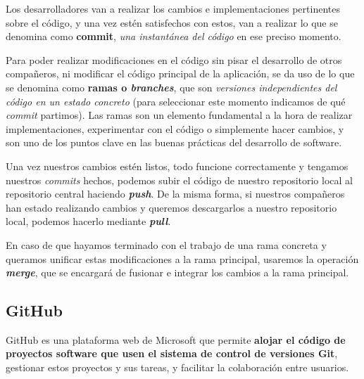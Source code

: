 
Los desarrolladores van a realizar los cambios e implementaciones pertinentes sobre el código, y una vez estén satisfechos con estos, van a realizar lo que se denomina como \textbf{commit}, \textit{una instantánea del código} en ese preciso momento.


Para poder realizar modificaciones en el código sin pisar el desarrollo de otros compañeros, ni modificar el código principal de la aplicación, se da uso de lo que se denomina como \textbf{ramas o \textit{branches}}, que son \textit{versiones independientes del código en un estado concreto} (para seleccionar este momento indicamos de qué \textit{commit} partimos). Las ramas son un elemento fundamental a la hora de realizar implementaciones, experimentar con el código o simplemente hacer cambios, y son uno de los puntos clave en las buenas prácticas del desarrollo de software.

Una vez nuestros cambios estén listos, todo funcione correctamente y tengamos nuestros \textit{commits} hechos, podemos subir el código de nuestro repositorio local al repositorio central haciendo \textit{\textbf{push}}. De la misma forma, si nuestros compañeros han estado realizando cambios y queremos descargarlos a nuestro repositorio local, podemos hacerlo mediante \textit{\textbf{pull}}.


En caso de que hayamos terminado con el trabajo de una rama concreta y queramos unificar estas modificaciones a la rama principal, usaremos la operación \textit{\textbf{merge}}, que se encargará de fusionar e integrar los cambios a la rama principal. \cite{git:git-basics}

\subsection{GitHub}


GitHub es una plataforma web de Microsoft que permite \textbf{alojar el código de proyectos software que usen el sistema de control de versiones Git}, gestionar estos proyectos y sus tareas, y facilitar la colaboración entre usuarios.

